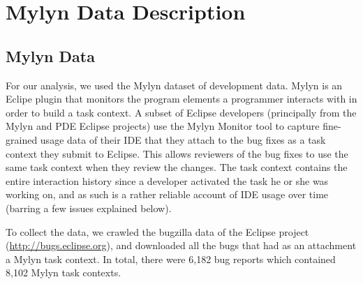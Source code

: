 \documentclass[times]{smrauth}
\begin{document}


\section{Mylyn Data Description}

\subsection{Mylyn Data}
For our analysis, we used the Mylyn dataset of development data.  Mylyn \cite{KM06} is an Eclipe plugin that monitors the program elements a programmer interacts with in order to build a task context. A subset of Eclipse developers (principally from the Mylyn and PDE Eclipse projects) use the Mylyn Monitor tool to capture fine-grained usage data of their IDE that they attach to the bug fixes as a task context they submit to Eclipse. This allows reviewers of the bug fixes to use the same task context when they review the changes. The task context contains the entire interaction history since a developer activated the task he or she was working on, and as such is a rather reliable account of IDE usage over time (barring a few issues explained below).


To collect the data, we crawled the bugzilla data of the Eclipse project (\url{http://bugs.eclipse.org}), and downloaded all the bugs that had as an attachment a Mylyn task context.  In total, there were 6,182 bug reports which contained 8,102 Mylyn task contexts.


\end{document}
